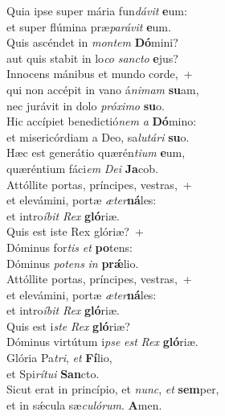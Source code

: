 \evenverse Quia ipse super mária fun\textit{dá}\textit{vit} \textbf{e}um:~\*\\
\evenverse et super flúmina præ\textit{pa}\textit{rá}\textit{vit} \textbf{e}um.\\
\oddverse Quis ascéndet in \textit{mon}\textit{tem} \textbf{Dó}mini?~\*\\
\oddverse aut quis stabit in lo\textit{co} \textit{san}\textit{cto} \textbf{e}jus?\\
\evenverse Innocens mánibus et mundo corde,~+\\
\evenverse  qui non accépit in vano á\textit{ni}\textit{mam} \textbf{su}am,~\*\\
\evenverse nec jurávit in dolo \textit{pró}\textit{xi}\textit{mo} \textbf{su}o.\\
\oddverse Hic accípiet benedictió\textit{nem} \textit{a} \textbf{Dó}mino:~\*\\
\oddverse et misericórdiam a Deo, sa\textit{lu}\textit{tá}\textit{ri} \textbf{su}o.\\
\evenverse Hæc est generátio quærén\textit{ti}\textit{um} \textbf{e}um,~\*\\
\evenverse quæréntium fáci\textit{em} \textit{De}\textit{i} \textbf{Ja}cob.\\
\oddverse Attóllite portas, príncipes, vestras,~+\\
\oddverse  et elevámini, portæ \textit{æ}\textit{ter}\textbf{ná}les:~\*\\
\oddverse et intro\textit{í}\textit{bit} \textit{Rex} \textbf{gló}riæ.\\
\evenverse Quis est iste Rex glóriæ?~+\\
\evenverse  Dóminus for\textit{tis} \textit{et} \textbf{po}tens:~\*\\
\evenverse Dóminus \textit{po}\textit{tens} \textit{in} \textbf{prǽ}lio.\\
\oddverse Attóllite portas, príncipes, vestras,~+\\
\oddverse  et elevámini, portæ \textit{æ}\textit{ter}\textbf{ná}les:~\*\\
\oddverse et intro\textit{í}\textit{bit} \textit{Rex} \textbf{gló}riæ.\\
\evenverse Quis est i\textit{ste} \textit{Rex} \textbf{gló}riæ?~\*\\
\evenverse Dóminus virtútum i\textit{pse} \textit{est} \textit{Rex} \textbf{gló}riæ.\\
\oddverse Glória Pa\textit{tri}, \textit{et} \textbf{Fí}lio,~\*\\
\oddverse et Spi\textit{rí}\textit{tu}\textit{i} \textbf{San}cto.\\
\evenverse Sicut erat in princípio, et \textit{nunc}, \textit{et} \textbf{sem}per,~\*\\
\evenverse et in sǽcula sæ\textit{cu}\textit{ló}\textit{rum}. \textbf{A}men.\\
